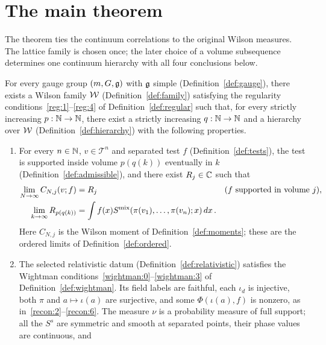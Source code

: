 \section{The main theorem}\label{subsec:main-theorem}\label{sec:theorem}

The theorem ties the continuum correlations to the original Wilson measures.
The lattice family is chosen once; the later choice of a volume subsequence determines one continuum hierarchy with all four conclusions below.

\begin{theorem}\label{thm:main}
For every gauge group $(m,G,\mathfrak g)$ with $\mathfrak g$ simple (Definition~\ref{def:gauge}), there exists a Wilson family $\mathcal W$ (Definition~\ref{def:family}) satisfying the regularity conditions~\ref{reg:1}--\ref{reg:4} of Definition~\ref{def:regular} such that, for every strictly increasing $p:\mathbb N\to\mathbb N$, there exist a strictly increasing $q:\mathbb N\to\mathbb N$ and a hierarchy over $\mathcal W$ (Definition~\ref{def:hierarchy}) with the following properties.
\begin{enumerate}[label=\textup{P\arabic*.},ref=P\arabic*]
\item\label{main:1} For every $n\in\mathbb N$, $v\in\mathcal T^n$ and separated test $f$ (Definition~\ref{def:tests}), the test is supported inside volume $p(q(k))$ eventually in $k$ (Definition~\ref{def:admissible}), and there exist $R_j\in\mathbb C$ such that
\begin{equation}\label{eq:main-limit}
\begin{aligned}
\lim_{N\to\infty}C_{N,j}(v;f)&=R_j
&&\text{($f$ supported in volume $j$)},\\
\lim_{k\to\infty}R_{p(q(k))}&=\int f(x)S^{\mathrm{mix}}(\pi(v_1),\ldots,\pi(v_n);x)\,dx\,.
\end{aligned}
\end{equation}
Here $C_{N,j}$ is the Wilson moment of Definition~\ref{def:moments}; these are the ordered limits of Definition~\ref{def:ordered}.
\item\label{main:2} The selected relativistic datum (Definition~\ref{def:relativistic}) satisfies the Wightman conditions~\ref{wightman:0}--\ref{wightman:3} of Definition~\ref{def:wightman}.
Its field labels are faithful, each $\iota_d$ is injective, both $\pi$ and $a\mapsto\iota(a)$ are surjective, and some $\Phi(\iota(a),f)$ is nonzero, as in~\ref{recon:2}--\ref{recon:6}.
The measure $\nu$ is a probability measure of full support; all the $S^s$ are symmetric and smooth at separated points, their phase values are continuous, and
\begin{equation*}

\end{equation*}
\end{enumerate}
\end{theorem}
